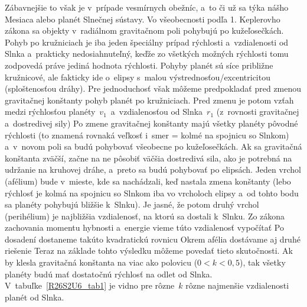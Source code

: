 {Zábavnejšie to však je v~prípade vesmírnych obežníc, a~to či už sa týka nášho
Mesiaca alebo planét Slnečnej sústavy. Vo všeobecnosti podľa 1. Keplerovho zákona
sa objekty v~radiálnom gravitačnom poli pohybujú po kužeľosečkách. Pohyb po
kružniciach je iba jeden špeciálny prípad rýchlosti a~vzdialenosti od Slnka a~prakticky
nedosiahnuteľný, keďže zo všetkých možných rýchlosti tomu zodpovedá práve jediná
hodnota rýchlosti. Pohyby planét sú síce približne kružnicové, ale fakticky ide o~elipsy
s~malou výstrednosťou/excentricitou (sploštenosťou dráhy). Pre jednoduchosť však
môžeme predpokladať pred zmenou gravitačnej konštanty pohyb planét po
kružniciach. Pred zmenu je potom vzťah medzi rýchlosťou
planéty~$v_1$~a~vzdialenosťou od Slnka~$r_1$ (z~rovnosti gravitačnej a~dostredivej
sily)
Po zmene gravitačnej konštanty majú všetky planéty pôvodné rýchlosti (to znamená
rovnaká veľkosť i~smer = kolmé na spojnicu so Slnkom) a~v~novom poli sa budú
pohybovať všeobecne po kužeľosečkách. Ak sa gravitačná konštanta zväčší, začne na
ne pôsobiť väčšia dostredivá sila, ako je potrebná na udržanie na kruhovej dráhe,
a~preto sa budú pohybovať po elipsách. Jeden vrchol (afélium) bude v~mieste, kde sa
nachádzali, keď nastala zmena konštanty (lebo rýchlosť je kolmá na spojnicu so
Slnkom iba vo vrcholoch elipsy a~od tohto bodu sa planéty pohybujú bližšie k~Slnku).
Je jasné, že potom druhý vrchol (perihélium) je najbližšia vzdialenosť, na ktorú sa
dostali k~Slnku. Zo zákona zachovania momentu hybnosti a~energie vieme túto
vzdialenosť vypočítať
Po dosadení dostaneme takúto kvadratickú rovnicu
Okrem afélia dostávame aj druhé riešenie
Teraz na základe tohto výsledku môžeme povedať tieto skutočnosti. Ak by klesla
gravitačná konštanta na viac ako polovicu ($0 < k< 0,5$), tak všetky planéty budú
mať dostatočnú rýchlosť na odlet od Slnka. V~tabuľke~\ref{R26S2U6_tab1} je vidno pre
rôzne~$k$ rôzne najmenšie vzdialenosti planét od Slnka.

}
